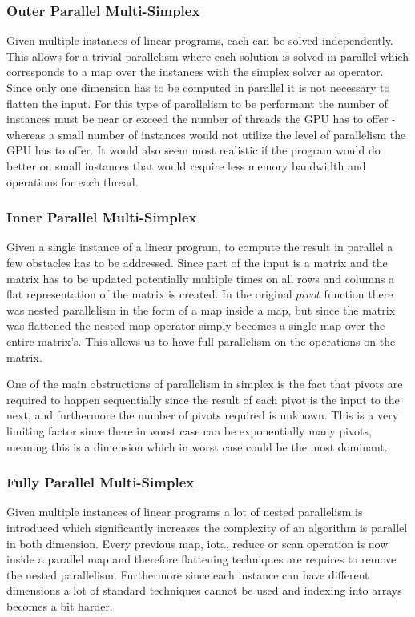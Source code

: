 \subsubsection{Outer Parallel Multi-Simplex}
Given multiple instances of linear programs, each can be solved independently. This allows for a trivial parallelism where each solution is solved in parallel which corresponds to a map over the instances with the simplex solver as operator. Since only one dimension has to be computed in parallel it is not necessary to flatten the input. For this type of parallelism to be performant the number of instances must be near or exceed the number of threads the GPU has to offer - whereas a small number of instances would not utilize the level of parallelism the GPU has to offer. It would also seem most realistic if the program would do better on small instances that would require less memory bandwidth and operations for each thread.

\subsubsection{Inner Parallel Multi-Simplex}
Given a single instance of a linear program, to compute the result in parallel a few obstacles has to be addressed. Since part of the input is a matrix and the matrix has to be updated potentially multiple times on all rows and columns a flat representation of the matrix is created. In the original $pivot$ function there was nested parallelism in the form of a map inside a map, but since the matrix was flattened the nested map operator simply becomes a single map over the entire matrix's. This allows us to have full parallelism on the operations on the matrix. 

One of the main obstructions of parallelism in simplex is the fact that pivots are required to happen sequentially since the result of each pivot is the input to the next, and furthermore the number of pivots required is unknown. This is a very limiting factor since there in worst case can be exponentially many pivots, meaning this is a dimension which in worst case could be the most dominant.

\subsubsection{Fully Parallel Multi-Simplex}
Given multiple instances of linear programs a lot of nested parallelism is introduced which significantly increases the complexity of an algorithm is parallel in both dimension. Every previous map, iota, reduce or scan operation is now inside a parallel map and therefore flattening techniques are requires to remove the nested parallelism. Furthermore since each instance can have different dimensions a lot of standard techniques cannot be used and indexing into arrays becomes a bit harder.


